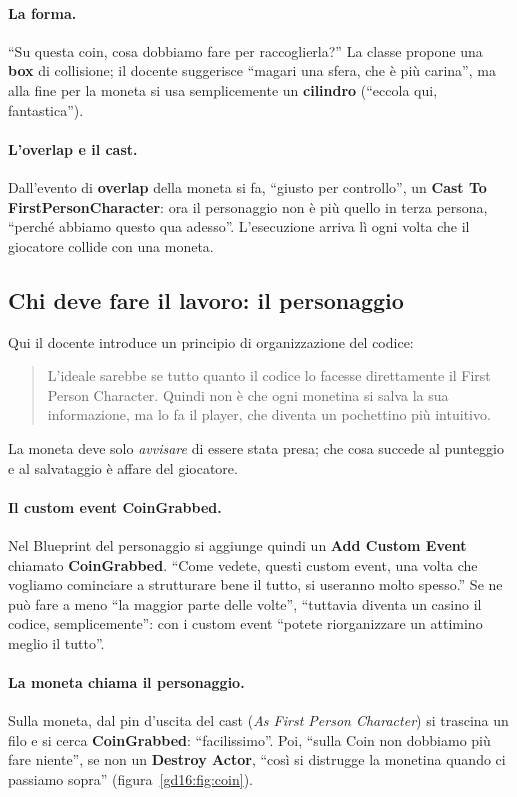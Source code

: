 \paragraph{La forma.} ``Su questa coin, cosa dobbiamo fare per raccoglierla?''
La classe propone una \textbf{box} di collisione; il docente suggerisce
``magari una sfera, che è più carina'', ma alla fine per la moneta si usa
semplicemente un \textbf{cilindro} (``eccola qui, fantastica'').

\paragraph{L'overlap e il cast.} Dall'evento di \textbf{overlap} della moneta
si fa, ``giusto per controllo'', un \textbf{Cast To FirstPersonCharacter}: ora
il personaggio non è più quello in terza persona, ``perché abbiamo questo qua
adesso''. L'esecuzione arriva lì ogni volta che il giocatore collide con una
moneta.

\subsection{Chi deve fare il lavoro: il personaggio}

Qui il docente introduce un principio di organizzazione del codice:
\begin{quote}
L'ideale sarebbe se tutto quanto il codice lo facesse direttamente il First
Person Character. Quindi non è che ogni monetina si salva la sua informazione,
ma lo fa il player, che diventa un pochettino più intuitivo.
\end{quote}
La moneta deve solo \emph{avvisare} di essere stata presa; che cosa succede al
punteggio e al salvataggio è affare del giocatore.

\paragraph{Il custom event CoinGrabbed.} Nel Blueprint del personaggio si
aggiunge quindi un \textbf{Add Custom Event} chiamato \textbf{CoinGrabbed}.
``Come vedete, questi custom event, una volta che vogliamo cominciare a
strutturare bene il tutto, si useranno molto spesso.'' Se ne può fare a meno
``la maggior parte delle volte'', ``tuttavia diventa un casino il codice,
semplicemente'': con i custom event ``potete riorganizzare un attimino meglio il
tutto''.

\paragraph{La moneta chiama il personaggio.} Sulla moneta, dal pin d'uscita del
cast (\emph{As First Person Character}) si trascina un filo e si cerca
\textbf{CoinGrabbed}: ``facilissimo''. Poi, ``sulla Coin non dobbiamo più fare
niente'', se non un \textbf{Destroy Actor}, ``così si distrugge la monetina
quando ci passiamo sopra'' (figura~\ref{gd16:fig:coin}).

